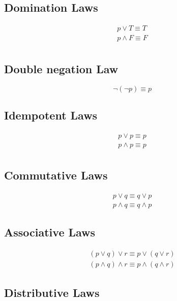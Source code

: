 \documentclass[12pt letter]{report}
\begin{document}
\subsection{Domination Laws}

\begin{align*}
	p \vee T \equiv T    \\
	p \wedge  F \equiv F \\
\end{align*}

\subsection{Double negation Law}

\[
	\neg \left( \neg p \right) \equiv p
\]

\subsection{Idempotent Laws}

\begin{align*}
	p \vee p  \equiv p  \\
	p \wedge p \equiv p \\
\end{align*}

\subsection{Commutative Laws}

\begin{align*}
	p \vee q \equiv q \vee p \\
	p \wedge q \equiv q \wedge p
\end{align*}

\subsection{Associative Laws}

\begin{align*}
	\left( p \vee q \right)  \vee  r \equiv p \vee \left( q \vee r \right) \\
	\left( p \wedge q \right) \wedge  r \equiv p \wedge \left( q \wedge r \right)
\end{align*}

\subsection{Distributive Laws}
\end{document}
